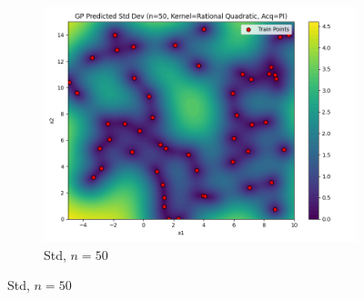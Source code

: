\documentclass[a4paper,12pt]{article}
\begin{document}
\begin{figure}[H]
\begin{subfigure}{0.3\textwidth}
    \includegraphics[width=\linewidth]{Task-02/images/gp_std_rational_quadratic_n50_PI.png}
    \caption{Std, $n=50$}
\end{subfigure}


\end{figure}
\end{document}
